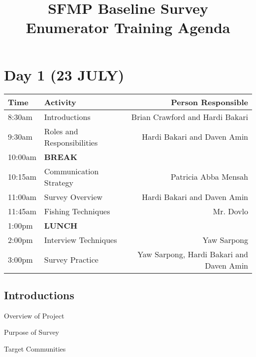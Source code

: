 \documentclass[a4paper,agenda,11pt]{meetingmins}
\begin{document}
\title{SFMP Baseline Survey Enumerator Training Agenda}

\maketitle

\section{Day 1 (23 JULY)}


\begin{tabularx}{\textwidth}{| l | X | r |} \hline
Time & Activity & Person Responsible \\ \hline \hline
8:30am &
Introductions &
Brian Crawford and Hardi Bakari \\ \hline

9:30am &
Roles and Responsibilities &
Hardi Bakari and Daven Amin \\ \hline

10:00am &
\textbf{BREAK} &
 \\ \hline

10:15am & 
Communication Strategy &
Patricia Abba Mensah \\ \hline

11:00am & 
Survey Overview &
Hardi Bakari and Daven Amin \\ \hline

11:45am & 
Fishing Techniques &
Mr. Dovlo \\ \hline

1:00pm & 
\textbf{LUNCH} &
 \\ \hline

2:00pm &
Interview Techniques &
Yaw Sarpong \\ \hline

3:00pm  & 
Survey Practice & 
Yaw Sarpong, Hardi Bakari and Daven Amin \\ \hline

\end{tabularx}

\subsection{Introductions}
\begin{subitems}
\item Overview of Project
\item Purpose of Survey
\item Target Communities
\end{subitems}
\end{document}
